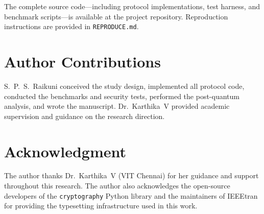 \documentclass[journal]{IEEEtran}
\begin{document}
The complete source code---including protocol implementations, test harness,
and benchmark scripts---is available at the project repository. Reproduction
instructions are provided in \texttt{REPRODUCE.md}.

\section*{Author Contributions}

S.~P.~S.~Raikuni conceived the study design, implemented all protocol code,
conducted the benchmarks and security tests, performed the post-quantum
analysis, and wrote the manuscript. Dr.~Karthika~V provided academic
supervision and guidance on the research direction.

\section*{Acknowledgment}

The author thanks Dr.~Karthika~V (VIT Chennai) for her guidance and support
throughout this research. The author also acknowledges the open-source
developers of the \texttt{cryptography} Python library and the maintainers of
IEEEtran for providing the typesetting infrastructure used in this work.



\end{document}
